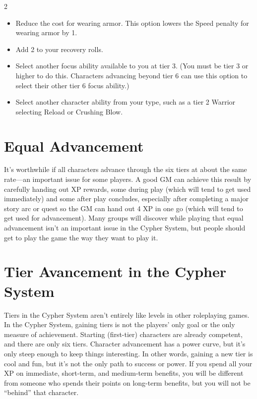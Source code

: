 \begin{multicols}{2}
\begin{itemize}
\item Reduce the cost for wearing armor. This option lowers the Speed penalty for wearing armor by 1.

\item Add 2 to your recovery rolls.

\item Select another focus ability available to you at tier 3. (You must be tier 3 or higher to do this. Characters advancing beyond tier 6 can use this option to select their other tier 6 focus ability.)

\item Select another character ability from your type, such as a tier 2 Warrior selecting Reload or Crushing Blow.
\end{itemize}

\section{Equal Advancement}

It’s worthwhile if all characters advance through the six tiers at about the same rate—an important issue for some players. A good GM can achieve this result by carefully handing out XP rewards, some during play (which will tend to get used immediately) and some after play concludes, especially after completing a major story arc or quest so the GM can hand out 4 XP in one go (which will tend to get used for advancement). Many groups will discover while playing that equal advancement isn’t an important issue in the Cypher System, but people should get to play the game the way they want to play it.

\section{Tier Avancement in the Cypher System}

Tiers in the Cypher System aren’t entirely like levels in other roleplaying games. In the Cypher System, gaining tiers is not the players’ only goal or the only measure of achievement. Starting (first-tier) characters are already competent, and there are only six tiers. Character advancement has a power curve, but it’s only steep enough to keep things interesting. In other words, gaining a new tier is cool and fun, but it’s not the only path to success or power. If you spend all your XP on immediate, short-term, and medium-term benefits, you will be different from someone who spends their points on long-term benefits, but you will not be “behind” that character.


\end{multicols}
